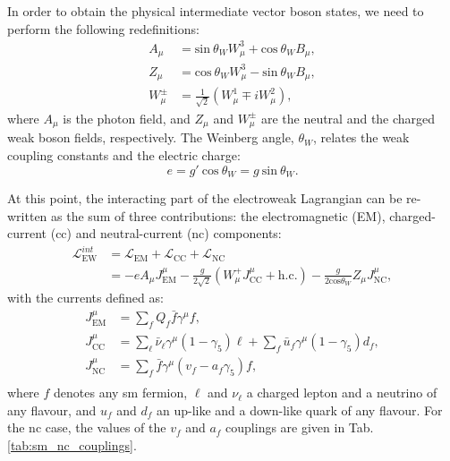 In order to obtain the physical intermediate vector boson states, we need to perform the following redefinitions:
\begin{equation}
	\begin{split}
		A_{\mu} &= \mathrm{sin}~\theta_{W} W^{3}_{\mu} + \mathrm{cos}~\theta_{W} B_{\mu},\\
		Z_{\mu} &= \mathrm{cos}~\theta_{W} W^{3}_{\mu} - \mathrm{sin}~\theta_{W} B_{\mu},\\
		W^{\pm}_{\mu} &= \frac{1}{\sqrt{2}}\left(W^{1}_{\mu} \mp i W^{2}_{\mu}\right),
	\end{split}
\end{equation}
where $A_{\mu}$ is the photon field, and $Z_{\mu}$ and $W^{\pm}_{\mu}$ are the neutral and the charged weak boson fields, respectively. The Weinberg angle, $\theta_{W}$, relates the weak coupling constants and the electric charge:
\begin{equation}
	e = g'~\mathrm{cos}~\theta_{W} = g~\mathrm{sin}~\theta_{W}.
\end{equation}

At this point, the interacting part of the electroweak Lagrangian can be re-written as the sum of three contributions: the electromagnetic (EM), charged-current (\gls{cc}) and neutral-current (\gls{nc}) components:
\begin{equation}\label{eq:int_lagrangian}
	\begin{split}
		\mathcal{L}^{int}_{\mathrm{EW}} &= \mathcal{L}_{\mathrm{EM}}+\mathcal{L}_{\mathrm{CC}}+\mathcal{L}_{\mathrm{NC}}\\
		&= -e A_{\mu} J^{\mu}_{\mathrm{EM}} - \frac{g}{2\sqrt{2}} \left(W^{+}_{\mu}J^{\mu}_{\mathrm{CC}} + \mathrm{h.c.}\right) - \frac{g}{2 \mathrm{cos}\theta_{W}} Z_{\mu} J^{\mu}_{\mathrm{NC}},
	\end{split}
\end{equation}
with the currents defined as:
\begin{equation}\label{eq:currents}
	\begin{split}
		J^{\mu}_{\mathrm{EM}} &= \sum_{f} Q_{f} \bar{f}\gamma^{\mu}f,\\
		J^{\mu}_{\mathrm{CC}} &= \sum_{\ell}\bar{\nu}_{\ell}\gamma^{\mu}(1-\gamma_{5})\ell + \sum_{f}\bar{u}_{f}\gamma^{\mu}(1-\gamma_{5})d_{f},\\
		J^{\mu}_{\mathrm{NC}} &= \sum_{f} \bar{f}\gamma^{\mu}(v_{f} - a_{f}\gamma_{5})f,\\
	\end{split}
\end{equation}
where $f$ denotes any \gls{sm} fermion, $\ell$ and $\nu_{\ell}$ a charged lepton and a neutrino of any flavour, and $u_{f}$ and $d_{f}$ an up-like and a down-like quark of any flavour. For the \gls{nc} case, the values of the $v_{f}$ and $a_{f}$ couplings are given in Tab. \ref{tab:sm_nc_couplings}.


